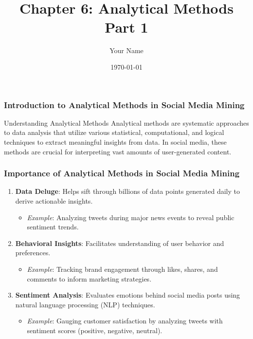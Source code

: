\documentclass{beamer}
\title{Chapter 6: Analytical Methods Part 1}
\author{Your Name}
\institute{Your Institution}
\date{\today}
\begin{document}
\frame{\titlepage}

\begin{frame}[fragile]
    \frametitle{Introduction to Analytical Methods in Social Media Mining}
    \begin{block}{Understanding Analytical Methods}
        Analytical methods are systematic approaches to data analysis that utilize various statistical, computational, and logical techniques to extract meaningful insights from data. In social media, these methods are crucial for interpreting vast amounts of user-generated content.
    \end{block}
\end{frame}

\begin{frame}[fragile]
    \frametitle{Importance of Analytical Methods in Social Media Mining}
    \begin{enumerate}
        \item \textbf{Data Deluge}: Helps sift through billions of data points generated daily to derive actionable insights.
            \begin{itemize}
                \item \textit{Example}: Analyzing tweets during major news events to reveal public sentiment trends.
            \end{itemize}
        
        \item \textbf{Behavioral Insights}: Facilitates understanding of user behavior and preferences.
            \begin{itemize}
                \item \textit{Example}: Tracking brand engagement through likes, shares, and comments to inform marketing strategies.
            \end{itemize}
        
        \item \textbf{Sentiment Analysis}: Evaluates emotions behind social media posts using natural language processing (NLP) techniques.
            \begin{itemize}
                \item \textit{Example}: Gauging customer satisfaction by analyzing tweets with sentiment scores (positive, negative, neutral).
            \end{itemize}
    \end{enumerate}
\end{frame}
\end{document}
